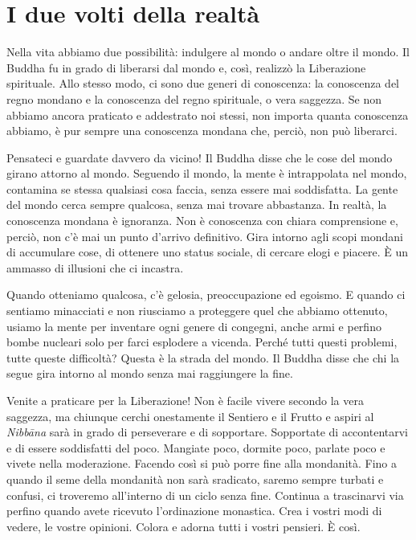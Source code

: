\chapter{I due volti della realtà}

Nella vita abbiamo due possibilità: indulgere al mondo o andare oltre il
mondo. Il Buddha fu in grado di liberarsi dal mondo e, così, realizzò la
Liberazione spirituale. Allo stesso modo, ci sono due generi di
conoscenza: la conoscenza del regno mondano e la conoscenza del regno
spirituale, o vera saggezza. Se non abbiamo ancora praticato e
addestrato noi stessi, non importa quanta conoscenza abbiamo, è pur
sempre una conoscenza mondana che, perciò, non può liberarci.

Pensateci e guardate davvero da vicino! Il Buddha disse che le cose del
mondo girano attorno al mondo. Seguendo il mondo, la mente è
intrappolata nel mondo, contamina se stessa qualsiasi cosa faccia, senza
essere mai soddisfatta. La gente del mondo cerca sempre qualcosa, senza
mai trovare abbastanza. In realtà, la conoscenza mondana è ignoranza.
Non è conoscenza con chiara comprensione e, perciò, non c'è mai un punto
d'arrivo definitivo. Gira intorno agli scopi mondani di accumulare cose,
di ottenere uno status sociale, di cercare elogi e piacere. È un ammasso
di illusioni che ci incastra.

Quando otteniamo qualcosa, c'è gelosia, preoccupazione ed egoismo. E
quando ci sentiamo minacciati e non riusciamo a proteggere quel che
abbiamo ottenuto, usiamo la mente per inventare ogni genere di congegni,
anche armi e perfino bombe nucleari solo per farci esplodere a vicenda.
Perché tutti questi problemi, tutte queste difficoltà? Questa è la
strada del mondo. Il Buddha disse che chi la segue gira intorno al mondo
senza mai raggiungere la fine.

Venite a praticare per la Liberazione! Non è facile vivere secondo la
vera saggezza, ma chiunque cerchi onestamente il Sentiero e il Frutto e
aspiri al \emph{Nibbāna} sarà in grado di perseverare e di sopportare.
Sopportate di accontentarvi e di essere soddisfatti del poco. Mangiate
poco, dormite poco, parlate poco e vivete nella moderazione. Facendo
così si può porre fine alla mondanità. Fino a quando il seme della
mondanità non sarà sradicato, saremo sempre turbati e confusi, ci
troveremo all'interno di un ciclo senza fine. Continua a trascinarvi via
perfino quando avete ricevuto l'ordinazione monastica. Crea i vostri
modi di vedere, le vostre opinioni. Colora e adorna tutti i vostri
pensieri. È così.

